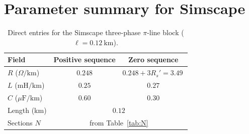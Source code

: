 \documentclass[11pt,a4paper]{article}
\begin{document}
\appendix
\section{Parameter summary for Simscape}
\begin{table}[h]
\centering
\caption{Direct entries for the Simscape three-phase $\pi$-line block
($\ell=0.12\ \mathrm{km}$).}
\begin{tabular}{@{}lcc@{}}
\toprule
Field & Positive sequence & Zero sequence \\
\midrule
$R$ ($\Omega/\mathrm{km}$) & $0.248$ & $0.248 + 3R_s' = 3.49$\,\footnotemark \\
$L$ ($\mathrm{mH/km}$) & $0.25$ & $0.27$ \\
$C$ ($\mu\mathrm{F/km}$) & $0.60$ & $0.30$ \\
Length (km) & \multicolumn{2}{c}{$0.12$} \\
Sections $N$ & \multicolumn{2}{c}{from Table~\ref{tab:N}} \\
\bottomrule
\end{tabular}
\end{table}
\end{document}
